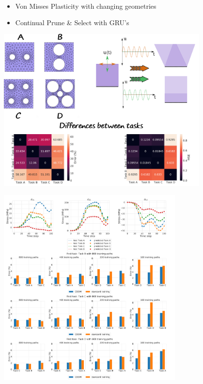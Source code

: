 \documentclass[a0paper,portrait]{baposter}
\begin{document}
\begin{poster}
{
  \begin{minipage}{0.5\textwidth}
    \begin{itemize}
      \item Von Misses Plasticity with changing geometries 
      \item Continual Prune \& Select with GRU's
    \end{itemize}
    \centering
    \includegraphics[width=0.8\textwidth]{figures/problem.pdf}
  \end{minipage}%
  \begin{minipage}{0.5\textwidth}
    \centering
    \includegraphics[width=0.7\textwidth]{figures/results.pdf}
  \end{minipage}
}


\end{poster}
\end{document}
